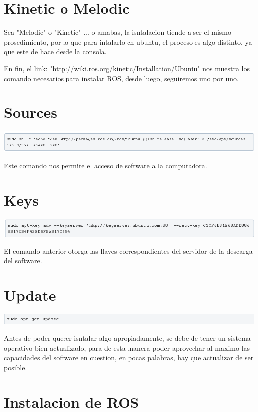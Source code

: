 \documentclass[11pt,a4paper]{article}
\begin{document}
{
\section{Kinetic o Melodic}

Sea "Melodic" o "Kinetic" ... o amabas, la isntalacion tiende a ser el mismo prosedimiento, por lo que para intalarlo en ubuntu, el proceso es algo distinto, ya que este de hace desde la consola. 

En fin, el link: "http://wiki.ros.org/kinetic/Installation/Ubuntu" nos muestra los comando necesarios para instalar ROS, desde luego, seguiremos uno por uno.
}

{
\section{Sources}

\includegraphics[scale=0.8]{EV1/1.png} 
}

Este comando nos permite el acceso de software a la computadora.

\section{Keys}

\includegraphics[scale=0.8]{EV1/2.png}

El comando anterior otorga las llaves correspondientes del servidor de la descarga del software. 

\section{Update}

\includegraphics[scale=0.8]{EV1/3.png}

Antes de poder querer isntalar algo apropiadamente, se debe de tener un sistema operativo bien actualizado, para de esta manera poder aprovechar al maximo las capacidades del software en cuestion, en pocas palabras, hay que actualizar de ser posible. 

\section{Instalacion de ROS}
\end{document}
